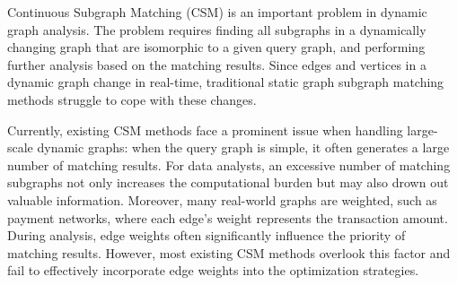 \begin{enabstract}
	Continuous Subgraph Matching (CSM) is an important problem in dynamic graph analysis. 
	The problem requires finding all subgraphs in a dynamically changing graph that are isomorphic to a given query graph, and performing further analysis based on the matching results. 
	Since edges and vertices in a dynamic graph change in real-time, traditional static graph subgraph matching methods struggle to cope with these changes.

    Currently, existing CSM methods face a prominent issue when handling large-scale dynamic graphs: when the query graph is simple, it often generates a large number of matching results. 
	For data analysts, an excessive number of matching subgraphs not only increases the computational burden but may also drown out valuable information. 
	Moreover, many real-world graphs are weighted, such as payment networks, where each edge’s weight represents the transaction amount. 
	During analysis, edge weights often significantly influence the priority of matching results. However, most existing CSM methods overlook this factor and fail to effectively incorporate edge weights into the optimization strategies.


\end{enabstract}
